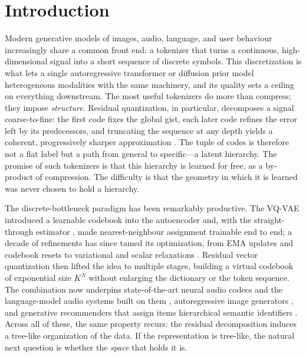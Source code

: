 \documentclass[12pt]{report}
\begin{document}
\chapter{Introduction}

Modern generative models of images, audio, language, and user behaviour increasingly
share a common front end: a tokenizer that turns a continuous, high-dimensional signal
into a short sequence of discrete symbols. This discretization is what lets a single
autoregressive transformer or diffusion prior model heterogeneous modalities with the
same machinery, and its quality sets a ceiling on everything downstream. The most useful
tokenizers do more than compress; they impose \emph{structure}. Residual quantization, in
particular, decomposes a signal coarse-to-fine: the first code fixes the global gist, each
later code refines the error left by its predecessors, and truncating the sequence at any
depth yields a coherent, progressively sharper approximation \cite{soundstream,lee2022rqvae}.
The tuple of codes is therefore not a flat label but a path from general to specific---a
latent hierarchy. The promise of such tokenizers is that this hierarchy is learned for
free, as a by-product of compression. The difficulty is that the geometry in which it is
learned was never chosen to hold a hierarchy.

The discrete-bottleneck paradigm has been remarkably productive. The VQ-VAE \cite{vqvae}
introduced a learnable codebook into the autoencoder and, with the straight-through
estimator \cite{straight_through_estimator}, made nearest-neighbour assignment trainable
end to end; a decade of refinements has since tamed its optimization, from EMA updates and
codebook resets to variational and scalar relaxations \cite{hqvae,gumbelvq,finitescalarquantizationfsq}.
Residual vector quantization \cite{soundstream,encodec} then lifted the idea to multiple
stages, building a virtual codebook of exponential size $K^{N}$ without enlarging the
dictionary or the token sequence. The combination now underpins state-of-the-art neural
audio codecs and the language-model audio systems built on them \cite{audiolm,musicgen},
autoregressive image generators \cite{lee2022rqvae}, and generative recommenders that
assign items hierarchical semantic identifiers \cite{tiger}. Across all of these, the same
property recurs: the residual decomposition induces a tree-like organization of the data.
If the representation is tree-like, the natural next question is whether the \emph{space}
that holds it is.
\end{document}
